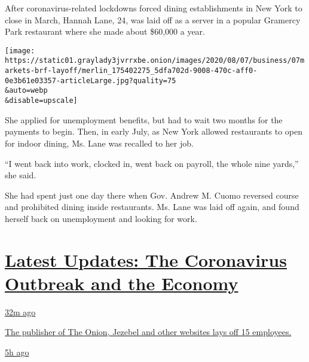 After coronavirus-related lockdowns forced dining establishments in New
York to close in March, Hannah Lane, 24, was laid off as a server in a
popular Gramercy Park restaurant where she made about \$60,000 a year.

\texttt{[image: https://static01.graylady3jvrrxbe.onion/images/2020/08/07/business/07markets-brf-layoff/merlin\_175402275\_5dfa702d-9008-470c-aff0-0e3b61e03357-articleLarge.jpg?quality=75\\\&auto=webp\\\&disable=upscale]}

She applied for unemployment benefits, but had to wait two months for
the payments to begin. Then, in early July, as New York allowed
restaurants to open for indoor dining, Ms. Lane was recalled to her job.

``I went back into work, clocked in, went back on payroll, the whole
nine yards,'' she said.

She had spent just one day there when Gov. Andrew M. Cuomo reversed
course and prohibited dining inside restaurants. Ms. Lane was laid off
again, and found herself back on unemployment and looking for work.

\hypertarget{latest-updates-the-coronavirus-outbreak-and-the-economy}{%
\section{\texorpdfstring{\href{https://www.nytimes3xbfgragh.onion/live/2020/08/07/business/stock-market-today-coronavirus?action=click\&pgtype=Article\&state=default\&region=MAIN_CONTENT_1\&context=storylines_live_updates}{Latest
Updates: The Coronavirus Outbreak and the
Economy}}{Latest Updates: The Coronavirus Outbreak and the Economy}}\label{latest-updates-the-coronavirus-outbreak-and-the-economy}}

\href{https://www.nytimes3xbfgragh.onion/live/2020/08/07/business/stock-market-today-coronavirus?action=click\&pgtype=Article\&state=default\&region=MAIN_CONTENT_1\&context=storylines_live_updates\#the-publisher-of-the-onion-jezebel-and-other-websites-lays-off-15-employees}{32m
ago}

\href{https://www.nytimes3xbfgragh.onion/live/2020/08/07/business/stock-market-today-coronavirus?action=click\&pgtype=Article\&state=default\&region=MAIN_CONTENT_1\&context=storylines_live_updates\#the-publisher-of-the-onion-jezebel-and-other-websites-lays-off-15-employees}{The
publisher of The Onion, Jezebel and other websites lays off 15
employees.}

\href{https://www.nytimes3xbfgragh.onion/live/2020/08/07/business/stock-market-today-coronavirus?action=click\&pgtype=Article\&state=default\&region=MAIN_CONTENT_1\&context=storylines_live_updates\#canada-outlines-its-response-to-the-new-us-aluminum-tariff}{5h
ago}


